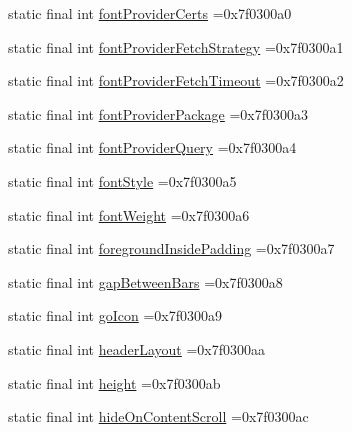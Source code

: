 \begin{DoxyCompactItemize}
static final int \mbox{\hyperlink{classcom_1_1example_1_1trainawearapplication_1_1_r_1_1attr_ac98830661d303a6b383c53e042d7545c}{font\+Provider\+Certs}} =0x7f0300a0
\item 
static final int \mbox{\hyperlink{classcom_1_1example_1_1trainawearapplication_1_1_r_1_1attr_a39dab2cd54994be8bb3de5f2ed586b69}{font\+Provider\+Fetch\+Strategy}} =0x7f0300a1
\item 
static final int \mbox{\hyperlink{classcom_1_1example_1_1trainawearapplication_1_1_r_1_1attr_ad5459a0cc05630c7eeb3e85c0de11cca}{font\+Provider\+Fetch\+Timeout}} =0x7f0300a2
\item 
static final int \mbox{\hyperlink{classcom_1_1example_1_1trainawearapplication_1_1_r_1_1attr_aba24dd0414d1002606346c40d2da5a96}{font\+Provider\+Package}} =0x7f0300a3
\item 
static final int \mbox{\hyperlink{classcom_1_1example_1_1trainawearapplication_1_1_r_1_1attr_a59e87c75178687392d7b92f9a0544222}{font\+Provider\+Query}} =0x7f0300a4
\item 
static final int \mbox{\hyperlink{classcom_1_1example_1_1trainawearapplication_1_1_r_1_1attr_aba40a0b6cbd54245bd99d4534849ebab}{font\+Style}} =0x7f0300a5
\item 
static final int \mbox{\hyperlink{classcom_1_1example_1_1trainawearapplication_1_1_r_1_1attr_a376af4263886b168dd86efec0d3c861e}{font\+Weight}} =0x7f0300a6
\item 
static final int \mbox{\hyperlink{classcom_1_1example_1_1trainawearapplication_1_1_r_1_1attr_abfc3fa9ca2b609d9cb5efc035befa967}{foreground\+Inside\+Padding}} =0x7f0300a7
\item 
static final int \mbox{\hyperlink{classcom_1_1example_1_1trainawearapplication_1_1_r_1_1attr_aafd162e5b756ab44949d53df2bb3abd2}{gap\+Between\+Bars}} =0x7f0300a8
\item 
static final int \mbox{\hyperlink{classcom_1_1example_1_1trainawearapplication_1_1_r_1_1attr_a44659b913a423af987905f6c525e8314}{go\+Icon}} =0x7f0300a9
\item 
static final int \mbox{\hyperlink{classcom_1_1example_1_1trainawearapplication_1_1_r_1_1attr_a5058eab513ec90065077ce4648121cec}{header\+Layout}} =0x7f0300aa
\item 
static final int \mbox{\hyperlink{classcom_1_1example_1_1trainawearapplication_1_1_r_1_1attr_a2885f6269b89a2ed84a6687905799bb9}{height}} =0x7f0300ab
\item 
static final int \mbox{\hyperlink{classcom_1_1example_1_1trainawearapplication_1_1_r_1_1attr_a2a5f3251c3db7175a6b4cdd16ea1bf22}{hide\+On\+Content\+Scroll}} =0x7f0300ac

\end{DoxyCompactItemize}
